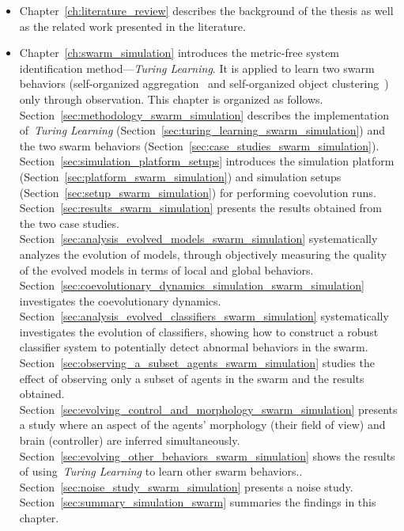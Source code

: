 \begin{itemize}
\item Chapter~\ref{ch:literature_review} describes the background of the thesis as well as the related work presented in the literature. 

\item Chapter~\ref{ch:swarm_simulation} introduces the metric-free system identification method---\textit{Turing Learning}. It is applied to learn two swarm behaviors (self-organized aggregation~\cite{Gauci2014_ijrr} and self-organized object clustering~\cite{Melvin2014_aamas}) only through observation. This chapter is organized as follows. Section~\ref{sec:methodology_swarm_simulation} describes the implementation of~\textit{Turing Learning} (Section~\ref{sec:turing_learning_swarm_simulation}) and the two swarm behaviors (Section~\ref{sec:case_studies_swarm_simulation}). Section~\ref{sec:simulation_platform_setups} introduces the simulation platform (Section~\ref{sec:platform_swarm_simulation}) and simulation setups (Section~\ref{sec:setup_swarm_simulation}) for performing coevolution runs. Section~\ref{sec:results_swarm_simulation} presents the results obtained from the two case studies. Section~\ref{sec:analysis_evolved_models_swarm_simulation} systematically analyzes the evolution of models, through objectively measuring the quality of the evolved models in terms of local and global behaviors. Section~\ref{sec:coevolutionary_dynamics_simulation_swarm_simulation} investigates the coevolutionary dynamics. Section~\ref{sec:analysis_evolved_classifiers_swarm_simulation} systematically investigates the evolution of classifiers, showing how to construct a robust classifier system to potentially detect abnormal behaviors in the swarm. Section~\ref{sec:observing_a_subset_agents_swarm_simulation} studies the effect of observing only a subset of agents in the swarm and the results obtained. Section~\ref{sec:evolving_control_and_morphology_swarm_simulation} presents a study where an aspect of the agents' morphology (their field of view) and brain (controller) are inferred simultaneously. Section~\ref{sec:evolving_other_behaviors_swarm_simulation} shows the results of using~\textit{Turing Learning} to learn other swarm behaviors.. Section~\ref{sec:noise_study_swarm_simulation} presents a noise study. Section~\ref{sec:summary_simulation_swarm} summaries the findings in this chapter.


\end{itemize}
